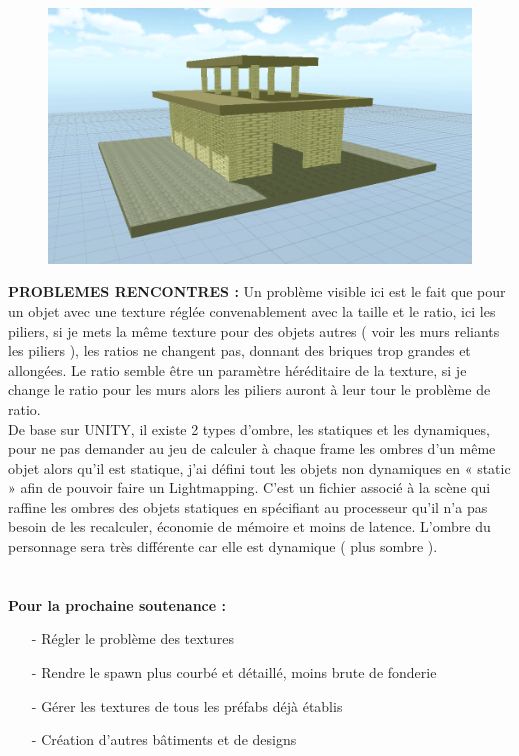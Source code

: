 \documentclass[a4paper]{article}
\begin{document}
\begin{figure}[h]
\begin{center}
\includegraphics[width=1\textwidth]{spawn.png}
\end{center}
\end{figure}
\textbf{PROBLEMES RENCONTRES :}
Un problème visible ici est le fait que pour un objet avec une texture réglée convenablement avec la taille et le ratio, ici les piliers, si je mets la même texture pour des objets autres ( voir les murs reliants les piliers ), les ratios ne changent pas, donnant des briques trop grandes et allongées. Le ratio semble être un paramètre héréditaire de la texture, si je change le ratio pour les murs alors les piliers auront à leur tour le problème de ratio.\\
De base sur UNITY, il existe 2 types d’ombre, les statiques et les dynamiques, pour ne pas demander au jeu de calculer à chaque frame les ombres d’un même objet alors qu’il est statique, j’ai défini tout les objets non dynamiques en « static » afin de pouvoir faire un Lightmapping. C’est un fichier associé à la scène qui raffine les ombres des objets statiques en spécifiant au processeur qu’il n’a pas besoin de les recalculer, économie de mémoire et moins de latence. L’ombre du personnage sera très différente car elle est dynamique ( plus sombre ).
\\ \\ \\
\textbf{Pour la prochaine soutenance :}
\begin{itemize}
\item[-]Régler le problème des textures
\item[-]Rendre le spawn plus courbé et détaillé, moins brute de fonderie
\item[-]Gérer les textures de tous les préfabs déjà établis
\item[-]Création d’autres bâtiments et de designs
\end{itemize}
\end{document}
